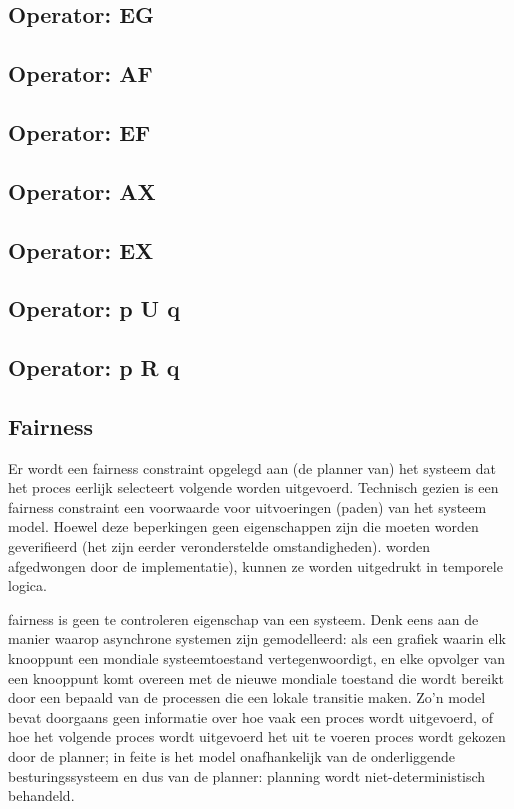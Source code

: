 \documentclass{article}
\begin{document}
	\subsection{Operator: EG}
		
	\subsection{Operator: AF}
			
	\subsection{Operator: EF}
	
	\subsection{Operator: AX}
	
	\subsection{Operator: EX}
	
	\subsection{Operator: p U q}
	
	\subsection{Operator: p R q}
	
	\subsection{Fairness}
	Er wordt een fairness constraint opgelegd aan (de planner van) het systeem dat het proces eerlijk selecteert
	volgende worden uitgevoerd. Technisch gezien is een fairness constraint een voorwaarde voor uitvoeringen (paden) van het systeem
	model. Hoewel deze beperkingen geen eigenschappen zijn die moeten worden geverifieerd (het zijn eerder veronderstelde omstandigheden).
	worden afgedwongen door de implementatie), kunnen ze worden uitgedrukt in temporele logica.
	
	fairness   is geen te controleren eigenschap van een systeem. Denk eens aan de manier waarop asynchrone systemen zijn
	gemodelleerd: als een grafiek waarin elk knooppunt een mondiale systeemtoestand vertegenwoordigt, en elke opvolger van een knooppunt
	komt overeen met de nieuwe mondiale toestand die wordt bereikt door een bepaald van de processen die een lokale transitie maken.
	Zo’n model bevat doorgaans geen informatie over hoe vaak een proces wordt uitgevoerd, of hoe het volgende proces wordt uitgevoerd
	het uit te voeren proces wordt gekozen door de planner; in feite is het model onafhankelijk van de onderliggende
	besturingssysteem en dus van de planner: planning wordt niet-deterministisch behandeld.
	\cite{WahlFairness}
	
\end{document}
